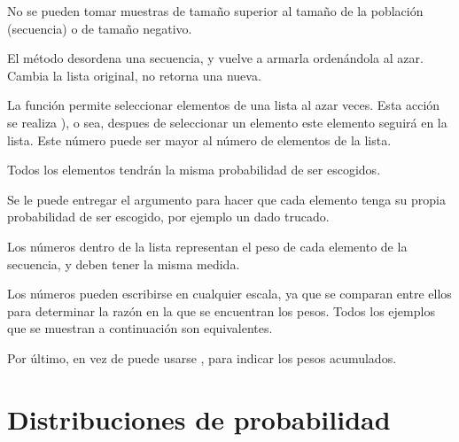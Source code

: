 
No se pueden tomar muestras de tamaño superior al tamaño de la población (secuencia) o de tamaño negativo.


El método  desordena una secuencia, y vuelve a armarla ordenándola al azar.
Cambia la lista original, no retorna una nueva.



La función  permite seleccionar elementos de una lista al azar  veces.
Esta acción se realiza ), o sea, despues de seleccionar un elemento este elemento seguirá en la lista.
Este número puede ser mayor al número de elementos de la lista.


Todos los elementos tendrán la misma probabilidad de ser escogidos.

Se le puede entregar el argumento  para hacer que cada elemento tenga su propia probabilidad de ser escogido, por ejemplo un dado trucado.


Los números dentro de la lista  representan el peso de cada elemento de la secuencia, y deben tener la misma medida.

Los números pueden escribirse en cualquier escala, ya que se comparan entre ellos para determinar la razón en la que se encuentran los pesos.
Todos los ejemplos que se muestran a continuación son equivalentes.


Por último, en vez de  puede usarse , para indicar los pesos acumulados.


\section{Distribuciones de probabilidad}

